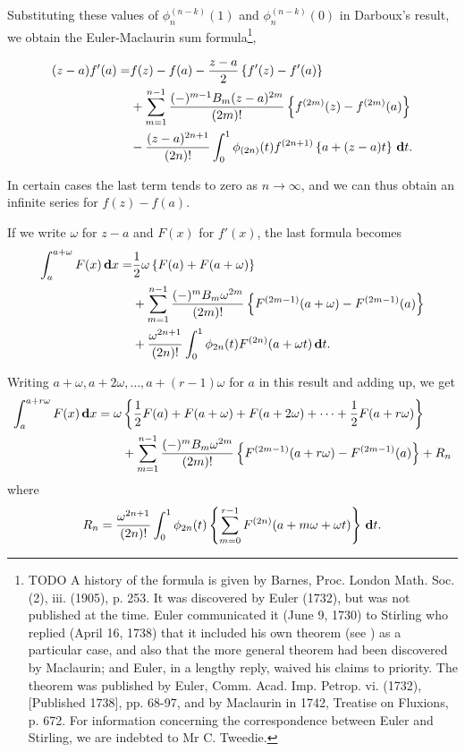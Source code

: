 Substituting these values of $\phi_{n}^{(n-k)}(1)$ and
$\phi_{n}^{(n-k)}(0)$ in Darboux's
result, we obtain the Euler-Maclaurin sum
formula\footnote{TODO A history of the formula is given by Barnes, Proc. London Math. Soc.
(2), iii. (1905), p. 253. It was discovered by Euler (1732), but was
not published at the time. Euler communicated it (June 9, 1730) to
Stirling who replied (April 16, 1738) that it included his own theorem
(see ) as a particular case, and also that the more general
theorem had been discovered by Maclaurin; and Euler, in a lengthy
reply, waived his claims to priority. The theorem was published by
Euler, Comm. Acad. Imp. Petrop. vi. (1732), [Published 1738], pp.
68-97, and by Maclaurin in 1742, Treatise on Fluxions, p. 672. For
information concerning the correspondence between Euler and Stirling,
we are indebted to Mr C. Tweedie.},

%
%
\begin{align*}
(z-a) f'(a)
=&
f(z) - f(a)
- \frac{z-a}{2} \left\{  f'(z) - f'(a)  \right\}
\\
&
+ \sum_{m=1}^{n-1} \frac{ (-)^{m-1} B_{m} (z-a)^{2m}}{(2m)!}
\left\{ f^{(2m)}(z) - f^{(2m)}(a) \right\}
\\
&
-\frac{(z-a)^{2n+1}}{(2n)!}
\int_{0}^{1} \phi_{(2n)}(t) f^{(2n+1)}\left\{  a + (z-a) t  \right\}
\, \mathbf{d} t.
\end{align*}

In certain cases the last term tends to zero as
$n \rightarrow \infty$, and we can
thus obtain an infinite series for $f(z) - f(a)$.

If we write $\omega$ for $z - a$ and $F(x)$ for $f'(x)$, the last formula becomes
\begin{align*}
  \int_{a}^{a+\omega} F(x) \, \mathbf{d} x
  =
  &
  \frac{1}{2} \omega \left\{  F(a) + F(a + \omega)  \right\}
  \\
  &
  + \sum_{m=1}^{n-1}
  \frac{(-)^{m} B_{m} \omega^{2m}}{(2m)!}
  \left\{ F^{(2m-1)}(a+\omega) - F^{(2m-1)}(a) \right\}
  \\
  &
  + \frac{\omega^{2n+1}}{(2n)!}
  \int_{0}^{1} \phi_{2n}(t) F^{(2n)}(a + \omega t) \, \mathbf{d} t.
\end{align*}

Writing $a + \omega, a + 2\omega, \ldots, a + (r-1) \omega$
for $a$ in this result and adding up, we get
\begin{align*}
\int_{a}^{a + r\omega} F(x) \, \mathbf{d} x
=
\omega
 &
\left\{ 
  \frac{1}{2} F(a) + F(a+\omega) + F(a+2\omega)
  + \cdots + \frac{1}{2} F(a + r\omega)
 \right\}
\\
&
+ \sum_{m=1}^{n-1}
\frac{(-)^{m} B_{m} \omega^{2m}}{(2m)!}
\left\{ 
  F^{(2m-1)}(a + r\omega)
  -
  F^{(2m-1)}(a)
 \right\}
+ R_{n}
\end{align*}
where
$$
R_{n}
=
\frac{\omega^{2n+1}}{(2n)!}
\int_{0}^{1} \phi_{2n}(t)
\left\{  \sum_{m=0}^{r-1} F^{(2n)}(a + m\omega + \omega t) \right\}
\, \mathbf{d} t.
$$

